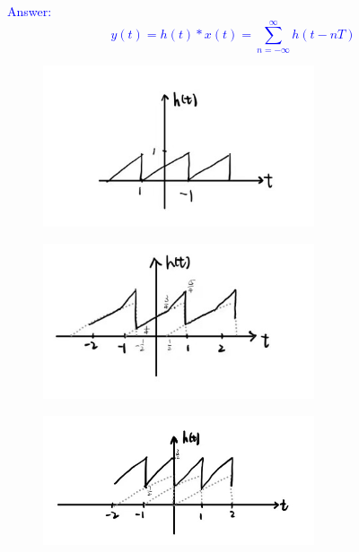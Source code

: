 \documentclass[12pt,a4paper]{article}
\begin{document}
\begin{tcolorbox}
\normalsize
\textcolor{blue}{Answer:\\
$$y(t)=h(t)*x(t)=\sum_{n=-\infty}^\infty h(t-nT)$$
\begin{figure}[H]
    \centering
    \includegraphics[width=8cm]{41.jpg}
\end{figure}
\begin{figure}[H]
    \centering
    \includegraphics[width=8cm]{42.jpg}
\end{figure}
\begin{figure}[H]
    \centering
    \includegraphics[width=8cm]{43.jpg}
\end{figure}
}
\end{tcolorbox}
\end{document}
